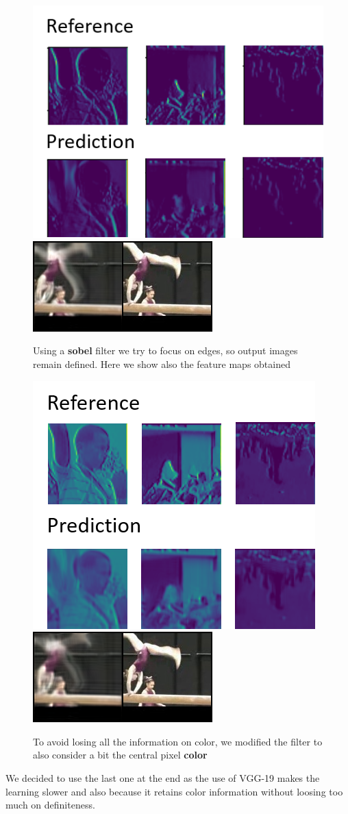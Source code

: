 \documentclass[11pt, a4paper]{article}
\begin{document}
	\begin{figure}
		\includegraphics[width=.5\textwidth]{map_sobel}
		\includegraphics[width=.3\textheight]{sobel}
		\caption{Using a \textbf{sobel} filter we try to focus on edges, so output images remain defined. Here we show also the feature maps obtained}
		\label{feature-map}
	\end{figure}
	\begin{figure}
		\includegraphics[width=0.3\textheight]{sobel_color_map}
		\includegraphics[width=0.3\textheight]{sobel_color}
		\caption{To avoid losing all the information on color, we modified the filter to also consider a bit the central pixel \textbf{color}}
		\label{color-feature-map}
	\end{figure}
	We decided to use the last one at the end as the use of VGG-19 makes the learning slower and also because it retains color information without loosing too much on definiteness.
\end{document}
